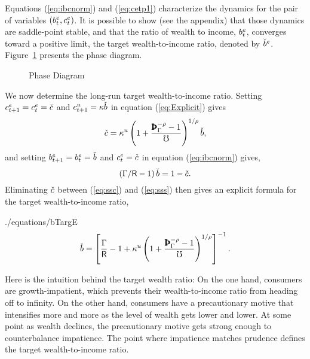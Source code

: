 \documentclass[titlepage,abstract,letterpaper]{econtex}
\begin{document}
Equations (\ref{eq:ibcnorm}) and (\ref{eq:cetp1}) characterize the dynamics for the pair of variables $(b^{e}_{t}, c^{e}_t)$. It is possible to show (see the appendix) that those dynamics are saddle-point stable, and that the ratio of wealth to income, $b^e_t$, converges toward a positive limit, the target wealth-to-income ratio, denoted by $\check{b}^{e}$.
Figure~\ref{fig:phaseDiag} presents the phase diagram.

\begin{figure}
\caption{Phase Diagram}\label{fig:phaseDiag}
\end{figure}

We now determine the long-run target wealth-to-income ratio. Setting $c^{e}_{t+1}=c^{e}_t=\check{c}$ and $c^{u}_{t+1}=\kappa \check{b}$ in equation (\ref{eq:Explicit}) gives
\begin{equation}
\cTarg = \MPCU \left(1+\frac{\PatPGro^{-\CRRA}-1}{\urate}\right)^{1/\CRRA} \bTarg,
\label{eq:ssc}
\end{equation}
and setting $b^{e}_{t+1}=b^{e}_t=\check{b}$ and $c^{e}_t=\check{c}$ in equation (\ref{eq:ibcnorm}) gives,
\begin{equation}
\left(\Gamma/\mathsf{R}-1 \right) \check{b} = 1 -\check{c}. \label{eq:sss}
\end{equation}
Eliminating $\check{c}$ between (\ref{eq:ssc}) and (\ref{eq:sss}) then gives an explicit formula for the target wealth-to-income ratio,
\begin{verbatimwrite}{./equations/bTargE}
\begin{equation}
 \bTarg= \left[\frac{\PGro}{\Rfree}-1+\MPCU \left(1+\frac{\PatPGro^{-\CRRA}-1}{\urate}\right)^{1/\CRRA}\right]^{-1}.
\label{eq:bTargE}
\end{equation}
\end{verbatimwrite}

Here is the intuition behind the target wealth ratio:  On the one hand,
consumers are growth-impatient, which prevents their wealth-to-income ratio
from heading off to infinity.  On the other hand, consumers have
a precautionary motive that intensifies more and more as the level of
wealth gets lower and lower.  At some point as wealth declines, the precautionary motive
gets strong enough to counterbalance impatience.  The point where impatience matches prudence defines the target wealth-to-income ratio.
\end{document}
